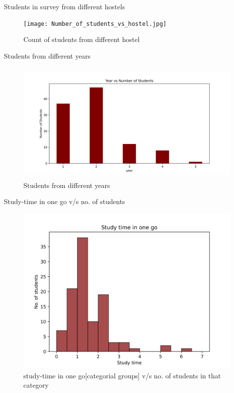 \documentclass{beamer}
\begin{document}
\begin{frame}
\begin{block}{Students in survey from different hostels}
\begin{figure}[hbtp]
\caption{Count of students from different hostel}
\centering
\texttt{[image: Number\_of\_students\_vs\_hostel.jpg]}
\end{figure}
\end{block}
\end{frame}

\begin{frame}
\begin{block}{Students from different years}
\begin{figure}[hbtp]
\caption{Students from different years}
\centering
\includegraphics[width = 1.0\textwidth, height=6cm]{year_vs_Number_of_students.png}
\end{figure}
\end{block}
\end{frame}

\begin{frame}
\begin{block}{Study-time in one go v/s no. of students}
\begin{figure}[hbtp]
\caption{study-time in one go[categorial groups] v/s no. of students in that category}
\centering
\includegraphics[scale=0.50]{Study time in one go.png}
\end{figure}
\end{block}
\end{frame}
\end{document}
